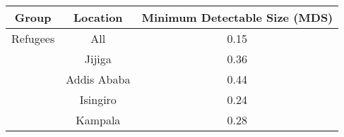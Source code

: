 \begin{tabular}{c|c|c}
Group & Location & Minimum Detectable Size (MDS) \\
\hline \hline
Refugees & All & 0.15 \\
 & Jijiga & 0.36 \\
 & Addis Ababa & 0.44 \\
 & Isingiro & 0.24 \\
 & Kampala & 0.28 \\
\hline
\end{tabular}
